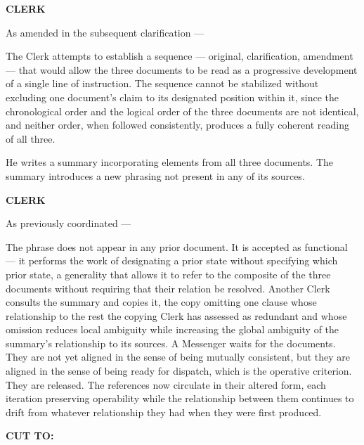\documentclass[12pt, oneside]{article}
\newcommand{\sceneheading}[1]{%
  \vspace{1.8em}%
  \noindent{\bfseries\large\MakeUppercase{#1}}%
  \vspace{0.6em}%
  \par\noindent{\color{rulecolor}\rule{\linewidth}{0.3pt}}%
  \vspace{0.5em}\par%
}
\newenvironment{action}{%
  \vspace{0.6em}%
  \noindent\ignorespaces%
}{%
  \par\vspace{0.6em}%
}
\newcommand{\character}[1]{%
  \vspace{0.8em}%
  \begin{center}%
    \bfseries\MakeUppercase{#1}%
  \end{center}%
  \vspace{-0.3em}%
}
\newenvironment{dialogue}{%
  \vspace{0.2em}%
  \begin{list}{}{%
    \setlength{\leftmargin}{1.2in}%
    \setlength{\rightmargin}{0.8in}%
    \setlength{\itemsep}{0.6em}%
    \setlength{\parsep}{0pt}%
  }%
}{%
  \end{list}%
  \vspace{0.4em}%
}
\newcommand{\says}[2]{%
  \character{#1}%
  \begin{dialogue}\item #2\end{dialogue}%
}
\newcommand{\transition}[1]{%
  \vspace{0.8em}%
  \begin{flushright}%
    \bfseries #1%
  \end{flushright}%
  \vspace{0.5em}%
}
\begin{document}
\says{Clerk}{As amended in the subsequent clarification ---}

\begin{action}
The Clerk attempts to establish a sequence --- original, clarification, amendment --- that would allow the three documents to be read as a progressive development of a single line of instruction. The sequence cannot be stabilized without excluding one document's claim to its designated position within it, since the chronological order and the logical order of the three documents are not identical, and neither order, when followed consistently, produces a fully coherent reading of all three.

He writes a summary incorporating elements from all three documents. The summary introduces a new phrasing not present in any of its sources.
\end{action}

\says{Clerk}{As previously coordinated ---}

\begin{action}
The phrase does not appear in any prior document. It is accepted as functional --- it performs the work of designating a prior state without specifying which prior state, a generality that allows it to refer to the composite of the three documents without requiring that their relation be resolved. Another Clerk consults the summary and copies it, the copy omitting one clause whose relationship to the rest the copying Clerk has assessed as redundant and whose omission reduces local ambiguity while increasing the global ambiguity of the summary's relationship to its sources. A Messenger waits for the documents. They are not yet aligned in the sense of being mutually consistent, but they are aligned in the sense of being ready for dispatch, which is the operative criterion. They are released. The references now circulate in their altered form, each iteration preserving operability while the relationship between them continues to drift from whatever relationship they had when they were first produced.
\end{action}

\transition{CUT TO:}

\sceneheading{INT. Study — Late Afternoon}
\end{document}

